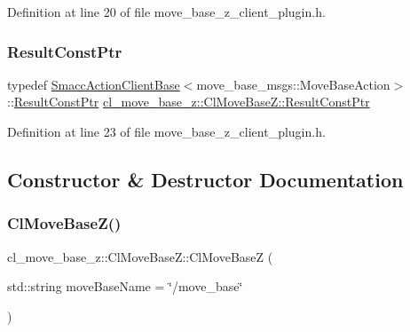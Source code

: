 Definition at line 20 of file move\+\_\+base\+\_\+z\+\_\+client\+\_\+plugin.\+h.

\mbox{\label{classcl__move__base__z_1_1ClMoveBaseZ_a99373d0c15ae96684462d8677f5fd632}} 
\subsubsection{\texorpdfstring{Result\+Const\+Ptr}{ResultConstPtr}}
{\footnotesize\ttfamily typedef \hyperlink{classsmacc_1_1client__bases_1_1SmaccActionClientBase_af38f27dd26f8a87fea6b3eaa4a84e604}{Smacc\+Action\+Client\+Base}$<$move\+\_\+base\+\_\+msgs\+::\+Move\+Base\+Action$>$\+::\hyperlink{classcl__move__base__z_1_1ClMoveBaseZ_a99373d0c15ae96684462d8677f5fd632}{Result\+Const\+Ptr} \hyperlink{classcl__move__base__z_1_1ClMoveBaseZ_a99373d0c15ae96684462d8677f5fd632}{cl\+\_\+move\+\_\+base\+\_\+z\+::\+Cl\+Move\+Base\+Z\+::\+Result\+Const\+Ptr}}



Definition at line 23 of file move\+\_\+base\+\_\+z\+\_\+client\+\_\+plugin.\+h.



\subsection{Constructor \& Destructor Documentation}
\mbox{\label{classcl__move__base__z_1_1ClMoveBaseZ_a4c44e8587c4054a15b06893518c3219c}} 
\subsubsection{\texorpdfstring{Cl\+Move\+Base\+Z()}{ClMoveBaseZ()}}
{\footnotesize\ttfamily cl\+\_\+move\+\_\+base\+\_\+z\+::\+Cl\+Move\+Base\+Z\+::\+Cl\+Move\+BaseZ (\begin{DoxyParamCaption}\item[{std\+::string}]{move\+Base\+Name = {\ttfamily \char`\"{}/move\+\_\+base\char`\"{}} }\end{DoxyParamCaption})}



